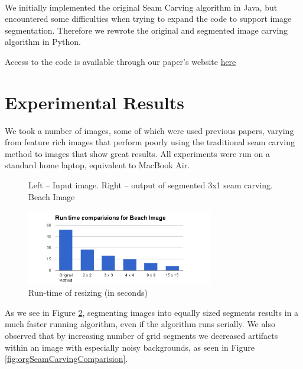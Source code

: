 \documentclass[conference]{acmsiggraph}
\begin{document}
\paragraph{}
We initially implemented the original Seam Carving algorithm in Java, but encountered some difficulties when trying to expand the code to support image segmentation. Therefore we rewrote the original and segmented image carving algorithm in Python. 

Access to the code is available through our paper's website  \href{https://github.com/tomerwei/seamCarving/blob/master/paper/acmsiggraph/cs269.pdf?raw=true}{here}


\section{Experimental Results}

We took a number of images, some of which were used previous papers, varying from feature rich images that perform poorly using the traditional seam carving method to images that show great results. All experiments were run on a standard home laptop, equivalent to MacBook Air.


\begin{figure}[ht]       
    \caption{Left -- Input image. Right -- output of segmented 3x1 seam carving. Beach Image}
    \label{materialflowChart}
\end{figure}


\begin{figure}[ht]
  \centering
  \includegraphics[width=3.2in]{images/beach}
  \caption{ Run-time of resizing (in seconds)}
  \label{fig:runtimes}
\end{figure}


As we see in Figure \ref{fig:runtimes}, segmenting images into equally sized segments results in a much faster running algorithm, even if the algorithm runs serially. We also observed that by increasing number of grid segments we decreased artifacts within an image with especially noisy backgrounds, as seen in Figure \ref{fig:orgSeamCarvingComparision}.
\end{document}
